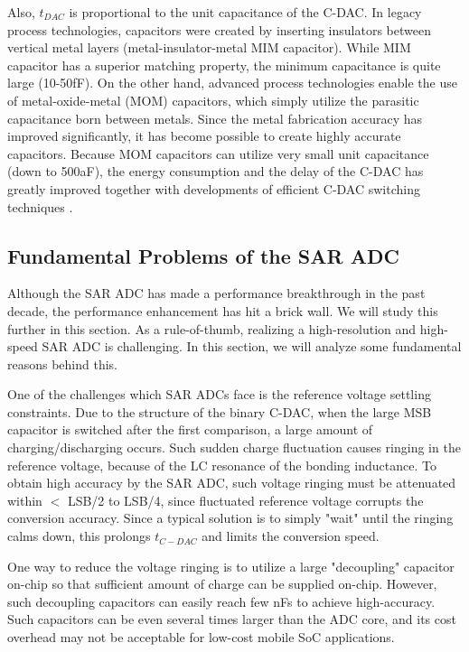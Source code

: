 Also, $t_{DAC}$ is proportional to the unit capacitance of the C-DAC. In legacy process technologies, capacitors were created by inserting insulators between vertical metal layers (metal-insulator-metal MIM capacitor). While MIM capacitor has a superior matching property, the minimum capacitance is quite large (10-50fF).
On the other hand, advanced process technologies enable the use of metal-oxide-metal (MOM) capacitors, which simply utilize the parasitic capacitance born between metals. Since the metal fabrication accuracy has improved significantly, it has become possible to create highly accurate capacitors. 
Because MOM capacitors can utilize very small unit capacitance (down to 500aF), the energy consumption and the delay of the C-DAC has greatly improved together with developments of efficient C-DAC switching techniques \cite{ccliu-sar-adc}.

\subsection{Fundamental Problems of the SAR ADC}
Although the SAR ADC has made a performance breakthrough in the past decade, the performance enhancement has hit a brick wall. We will study this further in this section. As a rule-of-thumb, realizing a high-resolution and high-speed SAR ADC is challenging. In this section, we will analyze some fundamental reasons behind this.

One of the challenges which SAR ADCs face is the reference voltage settling constraints. 
Due to the structure of the binary C-DAC, when the large MSB capacitor is switched after the first comparison, a large amount of charging/discharging occurs. 
Such sudden charge fluctuation causes ringing in the reference voltage, because of the LC resonance of the bonding inductance. 
To obtain high accuracy by the SAR ADC, such voltage ringing must be attenuated within $<$ LSB/2 to LSB/4, since fluctuated reference voltage corrupts the conversion accuracy. 
Since a typical solution is to simply "wait" until the ringing calms down, this prolongs $t_{C-DAC}$ and limits the conversion speed.

One way to reduce the voltage ringing is to utilize a large "decoupling" capacitor on-chip so that sufficient amount of charge can be supplied on-chip.
However, such decoupling capacitors can easily reach few nFs \cite{zhou201512} \cite{verbruggen201470} to achieve high-accuracy.
Such capacitors can be even several times larger than the ADC core, and its cost overhead may not be acceptable for low-cost mobile SoC applications.

